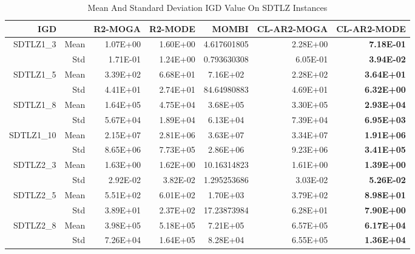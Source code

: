 \begin{table*}[htbp]
  \centering
  \caption{Mean And Standard Deviation IGD Value On SDTLZ Instances}
    \begin{tabular}{rrrrrrr}
    \toprule
    \multicolumn{2}{c}{IGD} & R2-MOGA & R2-MODE & MOMBI & CL-AR2-MOGA & CL-AR2-MODE \\
    \midrule
    \multirow{2}[0]{*}{SDTLZ1\_3} & Mean  & 1.07E+00 & 1.60E+00 & \multicolumn{1}{c}{4.617601805} & 2.28E+00 & \textbf{7.18E-01} \\
          & Std   & 1.71E-01 & 1.24E+00 & \multicolumn{1}{c}{0.793630308} & 6.05E-01 & \textbf{3.94E-02} \\
    \multirow{2}[0]{*}{SDTLZ1\_5} & Mean  & 3.39E+02 & 6.68E+01 & \multicolumn{1}{c}{7.16E+02} & 2.28E+02 & \textbf{3.64E+01} \\
          & Std   & 4.41E+01 & 2.74E+01 & \multicolumn{1}{c}{84.64980883} & 4.69E+01 & \textbf{6.32E+00} \\
    \multirow{2}[0]{*}{SDTLZ1\_8} & Mean  & 1.64E+05 & 4.75E+04 & \multicolumn{1}{c}{3.68E+05} & 3.30E+05 & \textbf{2.93E+04} \\
          & Std   & 5.67E+04 & 1.89E+04 & \multicolumn{1}{c}{6.13E+04} & 7.39E+04 & \textbf{6.95E+03} \\
    \multirow{2}[0]{*}{SDTLZ1\_10} & Mean  & 2.15E+07 & 2.81E+06 & \multicolumn{1}{c}{3.63E+07} & 3.34E+07 & \textbf{1.91E+06} \\
          & Std   & 8.65E+06 & 7.73E+05 & \multicolumn{1}{c}{2.86E+06} & 9.23E+06 & \textbf{3.41E+05} \\
    \multirow{2}[0]{*}{SDTLZ2\_3} & Mean  & 1.63E+00 & 1.62E+00 & \multicolumn{1}{c}{10.16314823} & 1.61E+00 & \textbf{1.39E+00} \\
          & Std   & 2.92E-02 & 3.82E-02 & \multicolumn{1}{c}{1.295253686} & 3.03E-02 & \textbf{5.26E-02} \\
    \multirow{2}[0]{*}{SDTLZ2\_5} & Mean  & 5.51E+02 & 6.01E+02 & \multicolumn{1}{c}{1.70E+03} & 3.79E+02 & \textbf{8.98E+01} \\
          & Std   & 3.89E+01 & 2.37E+02 & \multicolumn{1}{c}{17.23873984} & 6.28E+01 & \textbf{7.90E+00} \\
    \multirow{2}[0]{*}{SDTLZ2\_8} & Mean  & 3.98E+05 & 5.18E+05 & \multicolumn{1}{c}{7.21E+05} & 6.57E+05 & \textbf{6.17E+04} \\
          & Std   & 7.26E+04 & 1.64E+05 & \multicolumn{1}{c}{8.28E+04} & 6.55E+05 & \textbf{1.36E+04} \\

\end{tabular}
\end{table*}
